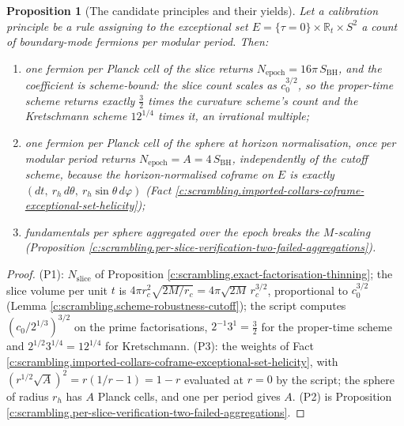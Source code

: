 \documentclass[11pt]{article}
\newtheorem{proposition}[theorem]{Proposition}
\theoremstyle{definition}
\theoremstyle{plain}
\providecommand{\R}{}\renewcommand{\R}{\mathbb{R}}
\providecommand{\SBH}{}\renewcommand{\SBH}{S_{\mathrm{BH}}}
\begin{document}
\begin{proposition}[The candidate principles and their yields]\label{c:scrambling.candidate-principles-their-yields}
Let a calibration principle be a rule assigning to the exceptional set $E = \{\tau = 0\} \times \R_t \times S^2$ a count of boundary-mode fermions per modular period. Then:
\begin{enumerate}
\item[(P1)] \emph{one fermion per Planck cell of the slice} returns $N_{\mathrm{epoch}} = 16\pi\,\SBH$, and the coefficient is scheme-bound: the slice count scales as $c_0^{3/2}$, so the proper-time scheme returns exactly $\tfrac32$ times the curvature scheme's count and the Kretschmann scheme $12^{1/4}$ times it, an irrational multiple;
\item[(P3)] \emph{one fermion per Planck cell of the sphere at horizon normalisation, once per modular period} returns $N_{\mathrm{epoch}} = A = 4\,\SBH$, independently of the cutoff scheme, because the horizon-normalised coframe on $E$ is exactly $(dt,\ r_h\,d\theta,\ r_h\sin\theta\,d\varphi)$ (Fact \ref{c:scrambling.imported-collars-coframe-exceptional-set-helicity});
\item[(P2)] \emph{fundamentals per sphere aggregated over the epoch} breaks the $M$-scaling (Proposition \ref{c:scrambling.per-slice-verification-two-failed-aggregations}).
\end{enumerate}
\end{proposition}
\begin{proof}
(P1): $N_{\mathrm{slice}}$ of Proposition \ref{c:scrambling.exact-factorisation-thinning}; the slice volume per unit $t$ is $4\pi r_c^2\sqrt{2M/r_c} = 4\pi\sqrt{2M}\,r_c^{3/2}$, proportional to $c_0^{3/2}$ (Lemma \ref{c:scrambling.scheme-robustness-cutoff}); the script computes $(c_0/2^{1/3})^{3/2}$ on the prime factorisations, $2^{-1}3^{1} = \tfrac32$ for the proper-time scheme and $2^{1/2}3^{1/4} = 12^{1/4}$ for Kretschmann. (P3): the weights of Fact \ref{c:scrambling.imported-collars-coframe-exceptional-set-helicity}, with $(r^{1/2}\sqrt A)^2 = r(1/r - 1) = 1 - r$ evaluated at $r = 0$ by the script; the sphere of radius $r_h$ has $A$ Planck cells, and one per period gives $A$. (P2) is Proposition \ref{c:scrambling.per-slice-verification-two-failed-aggregations}.

\end{proof}
\end{document}
